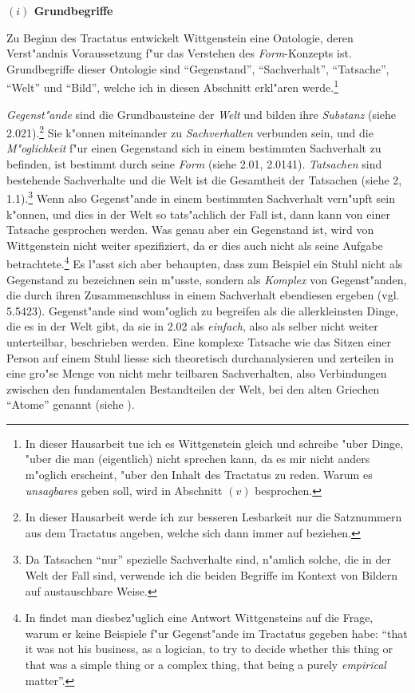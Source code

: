 \documentclass[a4paper, emulatestandardclasses, 12pt]{scrartcl}
\begin{document}
\begin{onehalfspace}
\noindent\textbf{$(i)$ Grundbegriffe}

\noindent Zu Beginn des Tractatus entwickelt Wittgenstein eine Ontologie, deren Verst"andnis Voraussetzung f"ur das Verstehen des \emph{Form}-Konzepts ist. Grundbegriffe dieser Ontologie sind "`Gegenstand"', "`Sachverhalt"', "`Tatsache"', "`Welt"' und "`Bild"', welche ich in diesen Abschnitt erkl"aren werde.\footnote{In dieser Hausarbeit tue ich es Wittgenstein gleich und schreibe "uber Dinge, "uber die man (eigentlich) nicht sprechen kann, da es mir nicht anders m"oglich erscheint, "uber den Inhalt des Tractatus zu reden. Warum es \emph{unsagbares} geben soll, wird in Abschnitt $(v)$ besprochen.}

\emph{Gegenst"ande} sind die Grundbausteine der \emph{Welt} und bilden ihre \emph{Substanz} (siehe 2.021).\footnote{In dieser Hausarbeit werde ich zur besseren Lesbarkeit nur die Satznummern aus dem Tractatus angeben, welche sich dann immer auf \cite{wittgenstein1963tractatus} beziehen.} Sie k"onnen miteinander zu \emph{Sachverhalten} verbunden sein, und die \emph{M"oglichkeit} f"ur einen Gegenstand sich in einem bestimmten Sachverhalt zu befinden, ist bestimmt durch seine \emph{Form} (siehe 2.01, 2.0141). \emph{Tatsachen} sind bestehende Sachverhalte und die Welt ist die Gesamtheit der Tatsachen (siehe 2, 1.1).\footnote{Da Tatsachen "`nur"' spezielle Sachverhalte sind, n"amlich solche, die in der Welt der Fall sind, verwende ich die beiden Begriffe im Kontext von Bildern auf austauschbare Weise.} Wenn also Gegenst"ande in einem bestimmten Sachverhalt vern"upft sein k"onnen, und dies in der Welt so tats"achlich der Fall ist, dann kann von einer Tatsache gesprochen werden. Was genau aber ein Gegenstand ist, wird von Wittgenstein nicht weiter spezifiziert, da er dies auch nicht als seine Aufgabe betrachtete.\footnote{In \cite[S. 70]{malcolm2001ludwig} findet man diesbez"uglich eine Antwort Wittgensteins auf die Frage, warum er keine Beispiele f"ur Gegenst"ande im Tractatus gegeben habe: "`that it was not his business, as a logician, to try to decide whether this thing or that was a simple thing or a complex thing, that being a purely \emph{empirical} matter"'.} Es l"asst sich aber behaupten, dass zum Beispiel ein Stuhl nicht als Gegenstand zu bezeichnen sein m"usste, sondern als \emph{Komplex} von Gegenst"anden, die durch ihren Zusammenschluss in einem Sachverhalt ebendiesen ergeben (vgl. 5.5423). Gegenst"ande sind wom"oglich zu begreifen als die allerkleinsten Dinge, die es in der Welt gibt, da sie in 2.02 als \emph{einfach}, also als selber nicht weiter unterteilbar, beschrieben werden. Eine komplexe Tatsache wie das Sitzen einer Person auf einem Stuhl liesse sich theoretisch durchanalysieren und zerteilen in eine gro"se Menge von nicht mehr teilbaren Sachverhalten, also Verbindungen zwischen den fundamentalen Bestandteilen der Welt, bei den alten Griechen "`Atome"' genannt (siehe \citealt{sep-atomism-ancient}). 

\end{onehalfspace}
\end{document}
